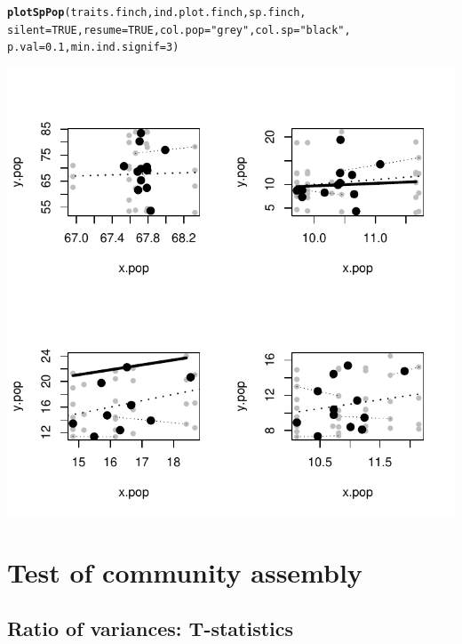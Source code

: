 \documentclass[12pt]{article}\usepackage[]{graphicx}\usepackage[]{color}
\makeatletter
\def\maxwidth{ %
  \ifdim\Gin@nat@width>\linewidth
    \linewidth
  \else
    \Gin@nat@width
  \fi
}
\newcommand{\hlnum}[1]{\textcolor[rgb]{0.686,0.059,0.569}{#1}}%
\newcommand{\hlstr}[1]{\textcolor[rgb]{0.192,0.494,0.8}{#1}}%
\newcommand{\hlstd}[1]{\textcolor[rgb]{0.345,0.345,0.345}{#1}}%
\newcommand{\hlkwc}[1]{\textcolor[rgb]{0.333,0.667,0.333}{#1}}%
\newcommand{\hlkwd}[1]{\textcolor[rgb]{0.737,0.353,0.396}{\textbf{#1}}}%
\newenvironment{kframe}{%
 \def\at@end@of@kframe{}%
 \ifinner\ifhmode%
  \def\at@end@of@kframe{\end{minipage}}%
  \begin{minipage}{\columnwidth}%
 \fi\fi%
 \def\FrameCommand##1{\hskip\@totalleftmargin \hskip-\fboxsep
 \colorbox{shadecolor}{##1}\hskip-\fboxsep
     \hskip-\linewidth \hskip-\@totalleftmargin \hskip\columnwidth}%
 \MakeFramed {\advance\hsize-\width
   \@totalleftmargin\z@ \linewidth\hsize
   \@setminipage}}%
 {\par\unskip\endMakeFramed%
 \at@end@of@kframe}
\newenvironment{knitrout}{}{} %
\makeatother
\begin{document}
\begin{knitrout}
\color{fgcolor}\begin{kframe}
\begin{alltt}
\hlkwd{plotSpPop}\hlstd{(traits.finch, ind.plot.finch, sp.finch,}
      \hlkwc{silent} \hlstd{=} \hlnum{TRUE}\hlstd{,} \hlkwc{resume} \hlstd{=} \hlnum{TRUE}\hlstd{,} \hlkwc{col.pop} \hlstd{=} \hlstr{"grey"}\hlstd{,} \hlkwc{col.sp} \hlstd{=} \hlstr{"black"}\hlstd{,}
      \hlkwc{p.val} \hlstd{=} \hlnum{0.1}\hlstd{,} \hlkwc{min.ind.signif} \hlstd{=} \hlnum{3}\hlstd{)}
\end{alltt}
\end{kframe}

{\centering \includegraphics[width=\maxwidth]{figure/unnamed-chunk-31-1} 

}



\end{knitrout}


\newpage

\section{Test of community assembly}

\subsection{Ratio of variances: T-statistics}
\end{document}

